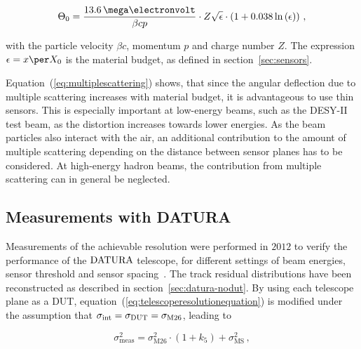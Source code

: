 \begin{equation}
\label{eq:multiplescattering}
\Theta_{0} = \frac{13.6\,\mega\electronvolt}{\beta c p} \cdot Z
\sqrt{\epsilon}
\cdot \left( 1 + 0.038 \ln{\left( \epsilon \right) } \right) \,,
\end{equation}

\noindent with the particle velocity $\beta c$, momentum $p$ and charge number $Z$. 
The expression $\epsilon = x \per X_0$ is the material budget, as defined in section~\ref{sec:sensors}.

Equation~(\ref{eq:multiplescattering}) shows, that since the angular deflection due to multiple scattering increases with material budget, it is advantageous to use thin sensors.
This is especially important at low-energy beams, such as the DESY-II test beam, as the distortion increases towards lower energies.
As the beam particles also interact with the air, an additional contribution to the amount of multiple scattering depending on the distance between sensor planes has to be considered. 
At high-energy hadron beams, the contribution from multiple scattering can in general be neglected.

\subsection{Measurements with DATURA}
\label{sec:measurements}

Measurements of the achievable resolution were performed in $2012$ to verify the performance of the $\textrm{DATURA}$ telescope, for different settings of beam energies, sensor threshold and sensor spacing~\cite{ref:thomas}.
The track residual distributions have been reconstructed as described in section~\ref{sec:datura-nodut}.
By using each telescope plane as a DUT, equation~(\ref{eq:telescoperesolutionequation}) is modified under the assumption that $\sigma_{\textrm{int}} = \sigma_{\textrm{DUT}} = \sigma_{\textrm{M26}}$,
 leading to

\begin{equation}
\label{eq:telescoperesolutionequation_2}
\sigma_{\textrm{meas}}^2 = \sigma_{\textrm{M26}}^2 \cdot \left( 1 + k_5 \right) +
\sigma_{\textrm{MS}}^2\,,
\end{equation}

